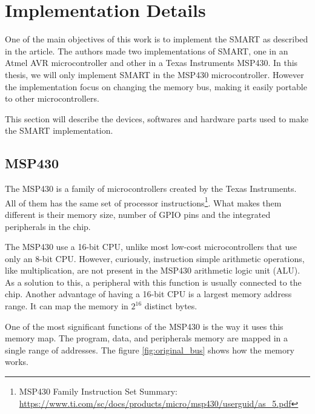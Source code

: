 \section{Implementation Details}

One of the main objectives of this work is to implement the SMART as described in the article. The authors made two implementations of SMART, one in an Atmel AVR microcontroller and other in a Texas Instruments MSP430. In this thesis, we will only implement SMART in the MSP430 microcontroller. However the implementation focus on changing the memory bus, making it easily portable to other microcontrollers.

This section will describe the devices, softwares and hardware parts used to make the SMART implementation.  

\subsection{MSP430}
\label{msp430}

The MSP430 is a family of microcontrollers created by the Texas Instruments. All of them has the same set of processor instructions\footnote{MSP430 Family Instruction Set Summary: \url{https://www.ti.com/sc/docs/products/micro/msp430/userguid/as_5.pdf}}. What makes them different is their memory size, number of GPIO pins and the integrated peripherals in the chip.

The MSP430 use a 16-bit CPU, unlike most low-cost microcontrollers that use only an 8-bit CPU. However, curiously, instruction simple arithmetic operations, like multiplication, are not present in the MSP430 arithmetic logic unit (ALU). As a solution to this, a peripheral with this function is usually connected to the chip. Another advantage of having a 16-bit CPU is a largest memory address range. It can map the memory in $2^{16}$ distinct bytes.

One of the most significant functions of the MSP430 is the way it uses this memory map. The program, data, and peripherals memory are mapped in a single range of addresses. The figure \ref{fig:original_bus} shows how the memory works. 

